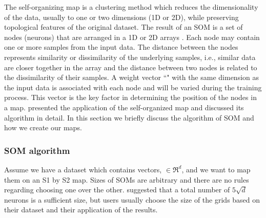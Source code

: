  The self-organizing map is a clustering method which reduces the dimensionality of the data, usually to one or two dimensions (1D or 2D), while preserving topological features of the original dataset.
 The result of an SOM is a set of nodes (neurons) that are arranged in a 1D or 2D arrays \citep{Kohonen98}. 
 Each node may contain one or more samples from the input data.
 The distance between the nodes represents similarity or dissimilarity of the underlying samples, i.e., similar data are closer together in the array and the distance between two nodes is related to the dissimilarity of their samples.
 A weight vector ``" with the same dimension as the input data is associated with each node and will be varied during the training process.
 This vector is the key factor in determining the position of the nodes in a map.
 \cite{Geach12} presented the application of the self-organized map and discussed its algorithm in detail.
 In this section we briefly discuss the algorithm of SOM and how we create our maps. 
 
 \subsubsection{SOM algorithm} 
 \label{sec: algorithm}
     Assume we have a dataset which contains vectors,  $\in \Re^d$, and we want to map them on an S1 by S2 map. 
     Sizes of SOMs are arbitrary and there are no rules regarding choosing one over the other. 
    \citet{Vesanto05} suggested that a total number of $5\sqrt{d}$ neurons is a sufficient size, but users usually choose the size of the grids based on their dataset and their application of the results.

